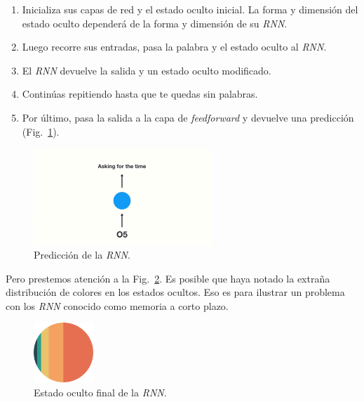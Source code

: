 \documentclass[a4paper,12pt]{article}
\begin{document}
\begin{enumerate}
	\item Inicializa sus capas de red y el estado oculto inicial. La forma y dimensión del estado oculto dependerá de la forma y dimensión de su \textit{RNN}.
	\item Luego recorre sus entradas, pasa la palabra y el estado oculto al \textit{RNN}.
	\item El \textit{RNN} devuelve la salida y un estado oculto modificado.
	\item Continúas repitiendo hasta que te quedas sin palabras.
	\item Por último, pasa la salida a la capa de \textit{feedforward} y devuelve una predicción (Fig.~\ref{fig:rnnvanishing2}).
\end{enumerate}

\begin{figure}[H]
	\begin{center}				
	\includegraphics[width=0.6\textwidth]{vanishing2.png}
  	\caption{Predicción de la \textit{RNN}.}
  	\label{fig:rnnvanishing2}
  	\end{center}
\end{figure}

Pero prestemos atención a la Fig.~\ref{fig:rnnvanishing3}. Es posible que haya notado la extraña distribución de colores en los estados ocultos. Eso es para ilustrar un problema con los \textit{RNN} conocido como memoria a corto plazo.

\begin{figure}[H]
	\begin{center}				
	\includegraphics[width=0.2\textwidth]{vanishin3.png}
  	\caption{Estado oculto final de la \textit{RNN}.}
  	\label{fig:rnnvanishing3}
  	\end{center}
\end{figure}
\end{document}
